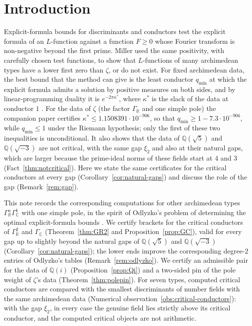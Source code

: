 \documentclass[11pt]{amsart}
\newcommand{\QQ}{\mathbb Q}
\newcommand{\xin}[1]{\xi_{#1}}
\newcommand{\GR}{\Gamma_{\mathbb R}}
\newcommand{\GC}{\Gamma_{\mathbb C}}
\newcommand{\kstar}{\kappa^{*}}
\newcommand{\qmin}{q_{\min}}
\theoremstyle{definition}
\theoremstyle{remark}
\numberwithin{equation}{section}
\begin{document}
\section{Introduction}\label{sec:intro}

Explicit-formula bounds for discriminants and conductors \cite{Odl76,Poi77,DyD80,Odl90} test the explicit formula of an
$L$-function against a function $F\ge0$ whose Fourier transform is non-negative beyond the first prime. Miller \cite{Mil02} used
the same positivity, with carefully chosen test functions, to show that $L$-functions of many archimedean types have a lower first
zero than $\zeta$, or do not exist. For fixed archimedean data, the best bound
that the method can give is the least conductor $\qmin$ at which the explicit formula admits a solution by positive measures
on both sides, and by linear-programming duality it is $e^{-2\pi\kstar}$, where $\kstar$ is the slack of the data at conductor
$1$ \cite{PaperI}. For the data of $\zeta$ (the factor $\GR$ and one simple pole) the companion paper certifies
$\kstar\le1.1508391\cdot10^{-906}$, so that $\qmin\ge1-7.3\cdot10^{-906}$, while $\qmin\le1$ under the Riemann hypothesis; only the
first of these two inequalities is unconditional. It also shows that the data of $\QQ(\sqrt5)$ and $\QQ(\sqrt{-3})$
are not critical, with the same gap $\xin2$ and also at their natural gaps, which are larger because the prime-ideal norms of these
fields start at $4$ and $3$ (Fact~\ref{thm:notcritical}). Here we state the same certificates for the critical conductors at every gap
(Corollary~\ref{cor:natural-gaps}) and discuss the role of the gap (Remark~\ref{rem:gap}).

This note records the corresponding computations for other archimedean types $\GR^a\GC^b$ with one simple pole, in the spirit
of Odlyzko's problem of determining the optimal explicit-formula bounds \cite{Odl90}. We certify brackets for the critical
conductors of $\GR^2$ and $\GC$ (Theorem~\ref{thm:GR2} and Proposition~\ref{prop:GC}), valid for every gap up to slightly beyond the
natural gaps of $\QQ(\sqrt5)$ and $\QQ(\sqrt{-3})$ (Corollary~\ref{cor:natural-gaps}); the lower ends improve the
corresponding degree-$2$ entries of Odlyzko's tables (Remark~\ref{rem:odlyzko}). We certify an admissible pair for the data of
$\QQ(i)$ (Proposition~\ref{prop:Qi}) and a two-sided pin of the pole weight of $\zeta$'s data (Theorem~\ref{thm:polepin}).
For seven types, computed critical conductors are compared with the smallest discriminants of number fields with the same
archimedean data (Numerical observation~\ref{obs:critical-conductors}): with the gap $\xin2$, in every case the genuine field lies
strictly above its critical conductor, and the computed critical objects are not arithmetic.
\end{document}
